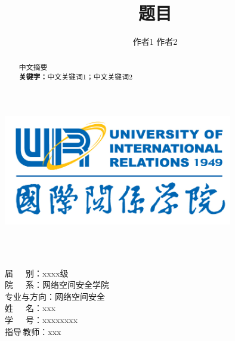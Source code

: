 \documentclass[12pt]{article}
\begin{document}
\begin{titlepage}
	\center
    \includegraphics[width=10cm]{UIR.png}\\[3cm]
    \begin{flushleft}
        \\[0.5cm] 
        \\[3cm] 
    \end{flushleft}
	\begin{minipage}{0.5\textwidth}
		\begin{flushleft}
			\heiti 届\quad\quad\ \ \, 别：xxxx级\\[0.5cm]
			\heiti 院\quad\quad\ \ \, 系：网络空间安全学院\\[0.5cm]
            \heiti 专业与方向：网络空间安全\\[0.5cm]
            \heiti 姓\quad\quad\ \ \, 名：xxx\\[0.5cm]
            \heiti 学\quad\quad\ \ \, 号：xxxxxxxx\\[0.5cm]
            \heiti 指\;导\;\,教\;师：xxx
		\end{flushleft}
	\end{minipage}\\[3cm]
	\vfill 
\end{titlepage}
\linespread{1.5}
\pagestyle{fancy}
\fancyhead[L, R]{}
\title{\songti {} \textbf{题目}}
\author{\fangsong {}作者1 \quad 作者2}
\date{}
\maketitle
\begin{abstract}
    \fangsong 中文摘要\\
     \textbf{\heiti 关键字：}中文关键词1；中文关键词2
\end{abstract}
\end{document}
